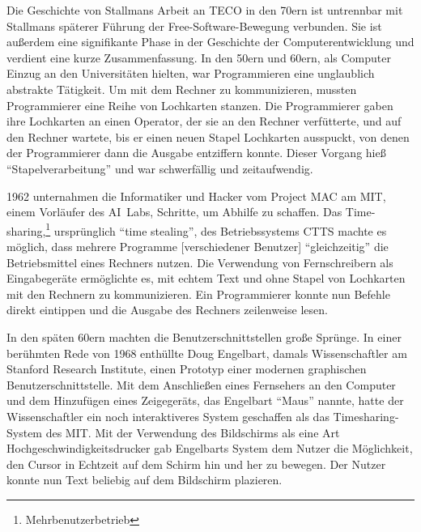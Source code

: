 Die Geschichte von Stallmans Arbeit an TECO in den 70ern ist untrennbar mit Stallmans späterer Führung der Free-Software-Bewegung verbunden. Sie ist außerdem eine signifikante Phase in der Geschichte der Computerentwicklung und verdient eine kurze Zusammenfassung. In den 50ern und 60ern, als Computer Einzug an den Universitäten hielten, war Programmieren eine unglaublich abstrakte Tätigkeit. Um mit dem Rechner zu kommunizieren, mussten Programmierer eine Reihe von Lochkarten stanzen. Die Programmierer gaben ihre Lochkarten an einen Operator, der sie an den Rechner verfütterte, und auf den Rechner wartete, bis er einen neuen Stapel Lochkarten ausspuckt, von denen der Programmierer dann die Ausgabe entziffern konnte. Dieser Vorgang hieß "`Stapelverarbeitung"' und war schwerfällig und zeitaufwendig.

1962 unternahmen die Informatiker und Hacker vom Project MAC am MIT, einem Vorläufer des AI~Labs, Schritte, um Abhilfe zu schaffen. Das Time-sharing,\footnote{Mehrbenutzerbetrieb} ursprünglich "`time stealing"', des Betriebssystems CTTS machte es möglich, dass mehrere Programme [verschiedener Benutzer] "`gleichzeitig"' die Betriebsmittel eines Rechners nutzen. Die Verwendung von Fernschreibern als Eingabegeräte ermöglichte es, mit echtem Text und ohne Stapel von Lochkarten mit den Rechnern zu kommunizieren. Ein Programmierer konnte nun Befehle direkt eintippen und die Ausgabe des Rechners zeilenweise lesen.

In den späten 60ern machten die Benutzerschnittstellen große Sprünge. In einer berühmten Rede von 1968 enthüllte Doug Engelbart, damals Wissenschaftler am Stanford Research Institute, einen Prototyp einer modernen graphischen Benutzerschnittstelle. Mit dem Anschließen eines Fernsehers an den Computer und dem Hinzufügen eines Zeigegeräts, das Engelbart "`Maus"' nannte, hatte der Wissenschaftler ein noch interaktiveres System geschaffen als das Timesharing-System des MIT. Mit der Verwendung des Bildschirms als eine Art Hochgeschwindigkeitsdrucker gab Engelbarts System dem Nutzer die Möglichkeit, den Cursor in Echtzeit auf dem Schirm hin und her zu bewegen. Der Nutzer konnte nun Text beliebig auf dem Bildschirm plazieren.

